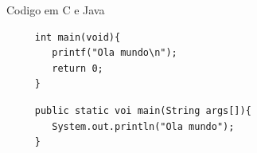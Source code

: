 \documentclass{beamer}
\begin{document}

%



\begin{frame}[fragile]{Codigo em C e Java}


\ansic
	\begin{lstlisting}
	 int main(void){
	    printf("Ola mundo\n");
	    return 0;
	 }
	\end{lstlisting}
\java
	\begin{lstlisting}
	 public static voi main(String args[]){
	    System.out.println("Ola mundo");
	 }
	\end{lstlisting}	
	
\end{frame}
\end{document}
